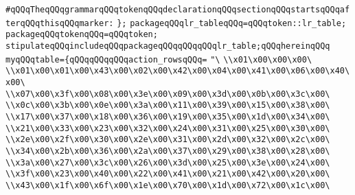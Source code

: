 \newline
\newline
\newline
\verb|#qQQqTheqQQqgrammarqQQqtokenqQQqdeclarationqQQqsectionqQQqstartsqQQqafterqQQqthisqQQqmarker:|\newline
\newline
\newline
\verb|};|\newline
\verb|packageqQQqlr_tableqQQq=qQQqtoken::lr_table;|\newline
\verb|packageqQQqtokenqQQq=qQQqtoken;|\newline
\verb|stipulateqQQqincludeqQQqpackageqQQqqQQqqQQqlr_table;qQQqhereinqQQq|\newline
\verb|myqQQqtable={qQQqqQQqqQQqaction_rowsqQQq=|\newline
\verb|"\|\newline
\verb|\\x01\x00\x00\x00\|\newline
\verb|\\x01\x00\x01\x00\x43\x00\x02\x00\x42\x00\x04\x00\x41\x00\x06\x00\x40\x00\|\newline
\verb|\\x07\x00\x3f\x00\x08\x00\x3e\x00\x09\x00\x3d\x00\x0b\x00\x3c\x00\|\newline
\verb|\\x0c\x00\x3b\x00\x0e\x00\x3a\x00\x11\x00\x39\x00\x15\x00\x38\x00\|\newline
\verb|\\x17\x00\x37\x00\x18\x00\x36\x00\x19\x00\x35\x00\x1d\x00\x34\x00\|\newline
\verb|\\x21\x00\x33\x00\x23\x00\x32\x00\x24\x00\x31\x00\x25\x00\x30\x00\|\newline
\verb|\\x2e\x00\x2f\x00\x30\x00\x2e\x00\x31\x00\x2d\x00\x32\x00\x2c\x00\|\newline
\verb|\\x34\x00\x2b\x00\x36\x00\x2a\x00\x37\x00\x29\x00\x38\x00\x28\x00\|\newline
\verb|\\x3a\x00\x27\x00\x3c\x00\x26\x00\x3d\x00\x25\x00\x3e\x00\x24\x00\|\newline
\verb|\\x3f\x00\x23\x00\x40\x00\x22\x00\x41\x00\x21\x00\x42\x00\x20\x00\|\newline
\verb|\\x43\x00\x1f\x00\x6f\x00\x1e\x00\x70\x00\x1d\x00\x72\x00\x1c\x00\|\newline
